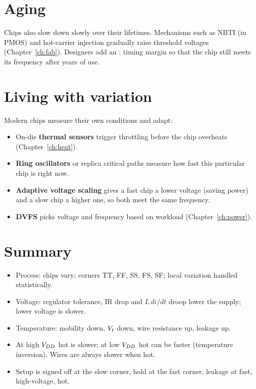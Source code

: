 \section{Aging}

Chips also slow down slowly over their lifetimes. Mechanisms such as NBTI (in PMOS) and hot-carrier injection gradually raise threshold voltages (Chapter~\ref{ch:fab}). Designers add an : timing margin so that the chip still meets its frequency after years of use.

\section{Living with variation}

Modern chips measure their own conditions and adapt:
\begin{itemize}
  \item On-die \textbf{thermal sensors} trigger throttling before the chip overheats (Chapter~\ref{ch:heat}).
  \item \textbf{Ring oscillators} or replica critical paths measure how fast this particular chip is right now.
  \item \textbf{Adaptive voltage scaling} gives a fast chip a lower voltage (saving power) and a slow chip a higher one, so both meet the same frequency.
  \item \textbf{DVFS} picks voltage and frequency based on workload (Chapter~\ref{ch:power}).
\end{itemize}

\section{Summary}

\begin{itemize}
  \item Process: chips vary; corners TT, FF, SS, FS, SF; local variation handled statistically.
  \item Voltage: regulator tolerance, IR drop and $L\,di/dt$ droop lower the supply; lower voltage is slower.
  \item Temperature: mobility down, $V_{t}$ down, wire resistance up, leakage up.
  \item At high $V_{DD}$ hot is slower; at low $V_{DD}$ hot can be faster (temperature inversion). Wires are always slower when hot.
  \item Setup is signed off at the slow corner, hold at the fast corner, leakage at fast, high-voltage, hot.
\end{itemize}

